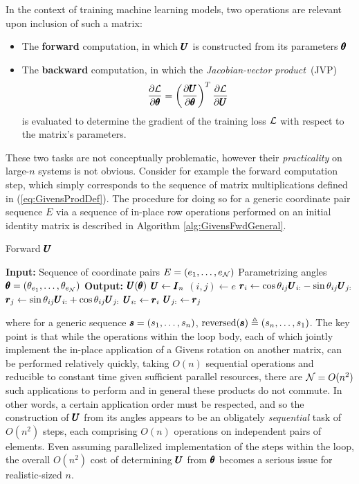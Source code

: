 \documentclass[superscriptaddress,floatfix]{article}
\begin{document}
In the context of training machine learning
models, two operations are relevant upon inclusion of such a matrix:
\begin{itemize}
\item The \textbf{forward} computation, in which
  ${\pmb{U}}$ is constructed from its parameters ${\pmb{\theta}}$
\item The \textbf{backward} computation, in which the
  \emph{Jacobian-vector product}~(JVP)
  \[
  \frac{\partial\mathcal{L}}{\partial{\pmb{\theta}}} = \left(
    \frac{\partial{\pmb{U}}}{\partial{\pmb{\theta}}} \right)^T \frac{\partial\mathcal{L}}{\partial{\pmb{U}}}
  \]
  is evaluated to determine the gradient of the training loss $\mathcal{L}$
  with respect to the matrix's parameters.
\end{itemize}
These two tasks are not conceptually problematic, however their
\emph{practicality} on large-$n$ systems is not obvious. Consider for
example the forward computation step, which simply corresponds to the
sequence of matrix multiplications defined in
(\ref{eq:GivensProdDef}). The procedure for doing so for a generic
coordinate pair sequence $E$ via a sequence of in-place row operations
performed on an initial identity matrix is described in Algorithm
\ref{alg:GivensFwdGeneral}.
\begin{algorithm}[H]
  \caption{Forward ${\pmb{U}}$}
  \label{alg:GivensFwdGeneral}
  \begin{algorithmic}[0] %
    \State \textbf{Input:}
    \State \hspace*{\algorithmicindent} Sequence of coordinate pairs $E = (e_1, \ldots, e_{\mathcal{N}})$
    \State \hspace*{\algorithmicindent} Parametrizing angles ${\pmb{\theta}} = (\theta_{e_1}, \ldots, \theta_{e_{\mathcal{N}}})$
    \State \textbf{Output:}
    \State \hspace*{\algorithmicindent} ${\pmb{U}}({\pmb{\theta}})$
    \State ${\pmb{U}} \gets {\pmb{I}}_n$
      \State $(i,j) \gets e$
      \State ${\pmb{r}}_i \gets \cos\theta_{ij}{\pmb{U}}_{i:} -
      \sin\theta_{ij}{\pmb{U}}_{j:}$
      \State ${\pmb{r}}_j \gets \sin\theta_{ij}{\pmb{U}}_{i:} +
      \cos\theta_{ij}{\pmb{U}}_{j:}$
      \State ${\pmb{U}}_{i:} \gets {\pmb{r}}_i$
      \State ${\pmb{U}}_{j:} \gets {\pmb{r}}_j$
    \EndFor
  \end{algorithmic}
\end{algorithm}
where for a generic sequence ${\pmb{s}} = ( s_1, \ldots, s_n)$,
$\textrm{reversed}({\pmb{s}}) \triangleq ( s_n, \ldots, s_1)$. The key point
is that while the operations within the loop body, each of which
jointly implement the in-place application of a Givens rotation on
another matrix, can be performed relatively quickly, taking $O(n)$
sequential operations and reducible to constant time given sufficient
parallel resources, there are $\mathcal{N} = O(n^2)$ such applications to
perform and in general these products do not commute. In other words,
a certain application order must be respected, and so the construction
of ${\pmb{U}}$ from its angles appears to be an obligately \emph{sequential}
task of $O(n^2)$ steps, each comprising $O(n)$ operations on
independent pairs of elements. Even assuming parallelized
implementation of the steps within the loop, the overall $O(n^2)$ cost
of determining ${\pmb{U}}$ from ${\pmb{\theta}}$ becomes a serious issue for
realistic-sized $n$.
\end{document}
